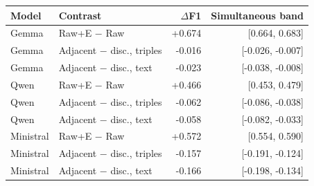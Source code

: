 \begin{tabular}{llrr}
\toprule
Model & Contrast & $\Delta$F1 & Simultaneous band \\
\midrule
Gemma & Raw+E $-$ Raw & +0.674 & [0.664, 0.683] \\
Gemma & Adjacent $-$ disc., triples & -0.016 & [-0.026, -0.007] \\
Gemma & Adjacent $-$ disc., text & -0.023 & [-0.038, -0.008] \\
Qwen & Raw+E $-$ Raw & +0.466 & [0.453, 0.479] \\
Qwen & Adjacent $-$ disc., triples & -0.062 & [-0.086, -0.038] \\
Qwen & Adjacent $-$ disc., text & -0.058 & [-0.082, -0.033] \\
Ministral & Raw+E $-$ Raw & +0.572 & [0.554, 0.590] \\
Ministral & Adjacent $-$ disc., triples & -0.157 & [-0.191, -0.124] \\
Ministral & Adjacent $-$ disc., text & -0.166 & [-0.198, -0.134] \\
\bottomrule
\end{tabular}
